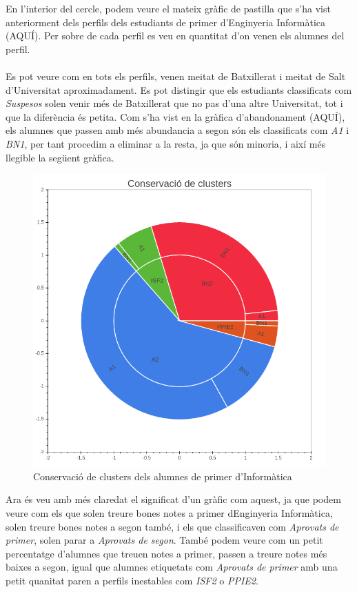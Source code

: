 \documentclass[12pt,a4paper,catalan]{article}
\begin{document}
En l'interior del cercle, podem veure el mateix gràfic de pastilla que s'ha vist anteriorment dels perfils dels estudiants de primer d'Enginyeria Informàtica (AQUÍ). Per sobre de cada perfil es veu en quantitat d'on venen els alumnes del perfil. 
\\
\\
Es pot veure com en tots els perfils, venen meitat de Batxillerat i meitat de Salt d'Universitat aproximadament. Es pot distingir que els estudiants classificats com \textit{Suspesos} solen venir més de Batxillerat que no pas d'una altre Universitat, tot i que la diferència és petita. Com s'ha vist en la gràfica d'abandonament (AQUÍ), els alumnes que passen amb més abundancia a segon són els classificats com \textit{A1} i \textit{BN1}, per tant procedim a eliminar a la resta, ja que són minoria, i així més llegible la següent gràfica.

\begin{figure}[h]
\centering
\includegraphics[width=.6\linewidth]{img/conservacio_clusters_segon_info.png}
\caption{Conservació de clusters dels alumnes de primer d'Informàtica}
\end{figure}

Ara és veu amb més claredat el significat d'un gràfic com aquest, ja que podem veure com els que solen treure bones notes a primer dEnginyeria Informàtica, solen treure bones notes a segon també, i els que classificaven com \textit{Aprovats de primer}, solen parar a \textit{Aprovats de segon}. També podem veure com un petit percentatge d'alumnes que treuen notes a primer, passen a treure notes més baixes a segon, igual que alumnes etiquetats com \textit{Aprovats de primer} amb una petit quanitat paren a perfils inestables com \textit{ISF2} o \textit{PPIE2}.
\end{document}
